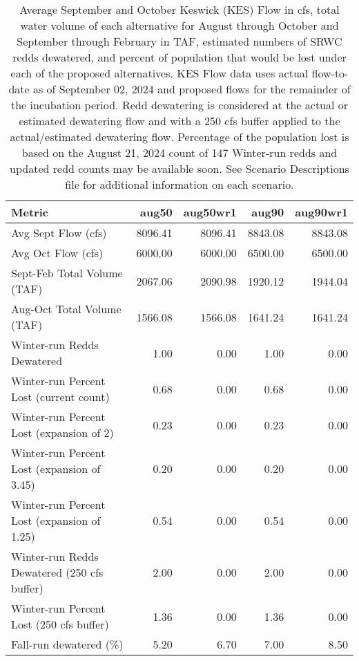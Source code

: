 \documentclass[
]{article}
\begin{document}
\begin{table}

\caption{\label{tab:unnamed-chunk-7}Average September and October Keswick (KES) Flow in cfs, total water volume of each alternative for August through October and September through February in TAF, estimated numbers of SRWC redds dewatered, and percent of population that would be lost under each of the proposed alternatives. KES Flow data uses actual flow-to-date as of September 02, 2024 and proposed flows for the remainder of the incubation period. Redd dewatering is considered at the actual or estimated dewatering flow and with a 250 cfs buffer applied to the actual/estimated dewatering flow. Percentage of the population lost is based on the August 21, 2024 count of 147 Winter-run redds and updated redd counts may be available soon. See Scenario Descriptions file for additional information on each scenario.}
\centering
\begin{tabular}[t]{l|r|r|r|r}
\hline
Metric & aug50 & aug50wr1 & aug90 & aug90wr1\\
\hline
Avg Sept Flow (cfs) & 8096.41 & 8096.41 & 8843.08 & 8843.08\\
\hline
Avg Oct Flow (cfs) & 6000.00 & 6000.00 & 6500.00 & 6500.00\\
\hline
Sept-Feb Total Volume (TAF) & 2067.06 & 2090.98 & 1920.12 & 1944.04\\
\hline
Aug-Oct Total Volume (TAF) & 1566.08 & 1566.08 & 1641.24 & 1641.24\\
\hline
Winter-run Redds Dewatered & 1.00 & 0.00 & 1.00 & 0.00\\
\hline
Winter-run Percent Lost (current count) & 0.68 & 0.00 & 0.68 & 0.00\\
\hline
Winter-run Percent Lost (expansion of 2) & 0.23 & 0.00 & 0.23 & 0.00\\
\hline
Winter-run Percent Lost (expansion of 3.45) & 0.20 & 0.00 & 0.20 & 0.00\\
\hline
Winter-run Percent Lost (expansion of 1.25) & 0.54 & 0.00 & 0.54 & 0.00\\
\hline
Winter-run Redds Dewatered (250 cfs buffer) & 2.00 & 0.00 & 2.00 & 0.00\\
\hline
Winter-run Percent Lost (250 cfs buffer) & 1.36 & 0.00 & 1.36 & 0.00\\
\hline
Fall-run dewatered (\%) & 5.20 & 6.70 & 7.00 & 8.50\\
\hline
\end{tabular}
\end{table}
\end{document}
